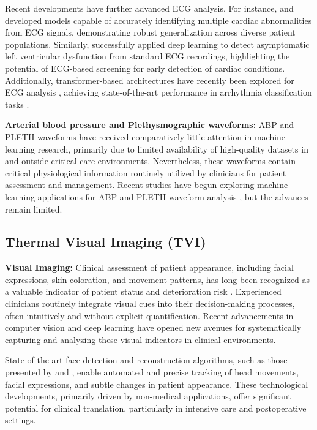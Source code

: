 Recent developments have further advanced ECG analysis. For instance, \citet{Dubatovka2024} and \citet{ribeiro2020automatic} developed models capable of accurately identifying multiple cardiac abnormalities from ECG signals, demonstrating robust generalization across diverse patient populations. Similarly, \citet{attia2019screening} successfully applied deep learning to detect asymptomatic left ventricular dysfunction from standard ECG recordings, highlighting the potential of ECG-based screening for early detection of cardiac conditions. Additionally, transformer-based architectures have recently been explored for ECG analysis \citep{ansari2023deep, xiao2023deep}, achieving state-of-the-art performance in arrhythmia classification tasks \citep{hu2022transformer, el2024ecgtransform}.

\vspace{1ex}
\noindent
\textbf{Arterial blood pressure and Plethysmographic waveforms:} ABP and PLETH waveforms have received comparatively little attention in machine learning research, primarily due to limited availability of high-quality datasets in and outside critical care environments. Nevertheless, these waveforms contain critical physiological information routinely utilized by clinicians for patient assessment and management. Recent studies have begun exploring machine learning applications for ABP and PLETH waveform analysis \citep{moghadam2020machine, alam2024systematic}, but the advances remain limited.

\subsection{Thermal Visual Imaging (TVI)}

\vspace{1ex}
\noindent
\textbf{Visual Imaging:}
Clinical assessment of patient appearance, including facial expressions, skin coloration, and movement patterns, has long been recognized as a valuable indicator of patient status and deterioration risk \citep{madrigal2018faces, Do_Temporal_changes}. Experienced clinicians routinely integrate visual cues into their decision-making processes, often intuitively and without explicit quantification. Recent advancements in computer vision and deep learning have opened new avenues for systematically capturing and analyzing these visual indicators in clinical environments.


State-of-the-art face detection and reconstruction algorithms, such as those presented by \citet{feng2018joint} and \citet{Deng_2020_CVPR}, enable automated and precise tracking of head movements, facial expressions, and subtle changes in patient appearance. These technological developments, primarily driven by non-medical applications, offer significant potential for clinical translation, particularly in intensive care and postoperative settings.

